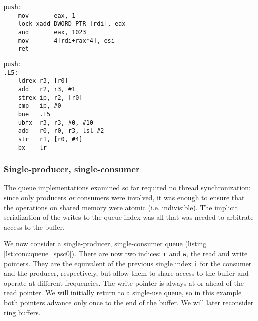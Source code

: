 \begin{multicols}{2}
    \begin{lstlisting}[style=x86]
push:
    mov       eax, 1
    lock xadd DWORD PTR [rdi], eax
    and       eax, 1023
    mov       4[rdi+rax*4], esi
    ret
    \end{lstlisting}
    \columnbreak
    \begin{lstlisting}[style=arm]
push:
.L5:
    ldrex r3, [r0]
    add   r2, r3, #1
    strex ip, r2, [r0]
    cmp   ip, #0
    bne   .L5
    ubfx  r3, r3, #0, #10
    add   r0, r0, r3, lsl #2
    str   r1, [r0, #4]
    bx    lr
    \end{lstlisting}
\end{multicols}
\vspace{-\baselineskip}

\subsubsection{Single-producer, single-consumer}

\begin{figure}[ht]
    \begin{subfigure}[t]{0.475\textwidth}
        
    \end{subfigure}
    \begin{subfigure}[t]{0.5\textwidth}
        
    \end{subfigure}
\end{figure}

The queue implementations examined so far required no thread synchronization:
since only producers \emph{or} consumers were involved, it was enough to ensure
that the operations on shared memory were atomic (i.e. indivisible).  The
implicit serialization of the writes to the queue index was all that was needed
to arbitrate access to the buffer.

We now consider a single-producer, single-consumer queue (listing
\ref{lst:conc:queue_spsc0}).  There are now two indices: \texttt{r} and
\texttt{w}, the read and write pointers.  They are the equivalent of the
previous single index \texttt{i} for the consumer and the producer,
respectively, but allow them to share access to the buffer and operate at
different frequencies.  The write pointer is always at or ahead of the read
pointer.  We will initially return to a single-use queue, so in this example
both pointers advance only once to the end of the buffer.  We will later
reconsider ring buffers.

